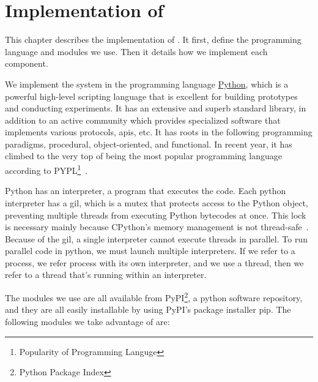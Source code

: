 

\chapter{Implementation of \project}\label{ch:implementation}\glsresetall
This chapter describes the implementation of \project. It first, define the programming language and modules we use. Then it details how we implement each component.

We implement the system in the programming language \href{https://www.python.org/}{Python}, which is a powerful high-level scripting language that is excellent for building prototypes and conducting experiments. It has an extensive and superb standard library, in addition to an active community which provides specialized software that implements various protocols, \acp{api}, etc. It has roots in the following programming paradigms, procedural, object-oriented, and functional. In recent year, it has climbed to the very top of being the most popular programming language according to PYPL\footnote{Popularity of Programming Languge}~\cite{pypl_python}.

Python has an interpreter, a program that executes the code. Each python interpreter has a \ac{gil}, which is a mutex that protects access to the Python object, preventing multiple threads from executing Python bytecodes at once. This lock is necessary mainly because CPython's memory management is not thread-safe~\cite{python_gil}. Because of the \ac{gil}, a single interpreter cannot execute threads in parallel. To run parallel code in python, we must launch multiple interpreters. If we refer to a process, we refer process with its own interpreter, and we use a thread, then we refer to a thread that's running within an interpreter.

The modules we use are all available from PyPI\footnote{Python Package Index}, a python software repository, and they are all easily installable by using PyPI's package installer pip. The following modules we take advantage of are:

